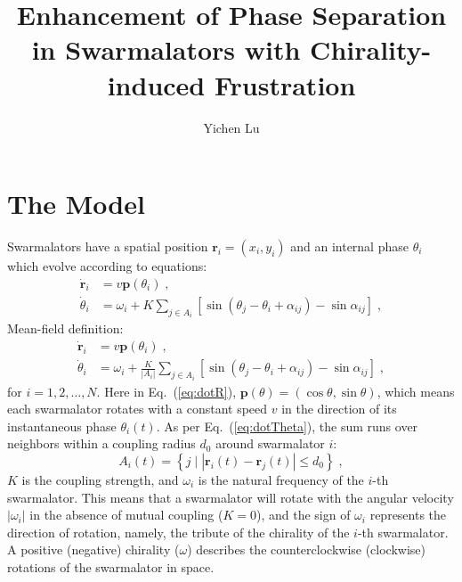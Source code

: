 \documentclass{article}
\title{\textbf{Enhancement of Phase Separation in Swarmalators with Chirality-induced Frustration}}
\author{Yichen Lu}
\begin{document}
\maketitle

\tableofcontents

\newpage
\section{\label{sec:model}The Model}

Swarmalators have a spatial position $\mathbf{r}_i=\left( x_i, y_i \right)$ and an internal phase $\theta_i$ which evolve according to equations:
\begin{subequations}
    \label{eq:totalDynamics}
    \begin{align}
        \dot{\mathbf{r}}_i&=v\mathbf{p}\left( \theta _i \right)\label{eq:dotR}\;,\\
        \dot{\theta}_i&=\omega _i+K\sum_{j\in A_i}{\left[ \sin \left( \theta _j-\theta _i+\alpha _{ij} \right) -\sin \alpha _{ij} \right]}\label{eq:dotTheta}\;,
    \end{align}
\end{subequations}
\color{blue}
Mean-field definition:
\begin{subequations} 
    \label{eq:totalDynamicsMeanField}
    \begin{align}
        \dot{\mathbf{r}}_i&=v\mathbf{p}\left( \theta _i \right)\;,
        \\
        \dot{\theta}_i&=\omega _i+\frac{K}{\left| A_i \right|}\sum_{j\in A_i}{\left[ \sin \left( \theta _j-\theta _i+\alpha _{ij} \right) -\sin \alpha _{ij} \right]}\;,
    \end{align}
\end{subequations}
\color{black}
for $i=1,2,\ldots,N$. Here in Eq.~(\ref{eq:dotR}), $\mathbf{p}\left( \theta \right) =\left( \cos \theta ,\sin \theta \right)$, which means each swarmalator rotates with a constant speed $v$ in the direction of its instantaneous phase $\theta_i (t)$. As per Eq.~(\ref{eq:dotTheta}), the sum runs over neighbors within a coupling radius $d_0$ around swarmalator $i$:
\begin{equation}
    A_i\left( t \right) =\left\{ j\mid \left| \mathbf{r}_i\left( t \right) -\mathbf{r}_j\left( t \right) \right|\leqslant d_0 \right\} \;,
\end{equation}
$K$ is the coupling strength, and $\omega_i$ is the natural frequency of the $i$-th swarmalator. 
This means that a swarmalator will rotate with the angular velocity $|\omega_i |$ in the absence of mutual coupling ($K=0$), and the sign of $\omega_i$ represents the direction of rotation, namely, the tribute of the chirality of the $i$-th swarmalator. A positive (negative) chirality ($\omega$) describes the counterclockwise (clockwise) rotations of the swarmalator in space. 
\end{document}
